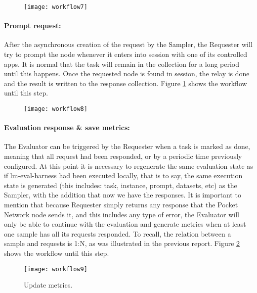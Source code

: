 \begin{figure}[H]
    \centering
    \texttt{[image: workflow7]}
    \caption{}
    \label{secb:fig:wf7}
\end{figure}


\paragraph{Prompt request:}
After the asynchronous creation of the request by the Sampler, the Requester will try to prompt the node whenever it enters into session with one of its controlled apps. It is normal that the task will remain in the collection for a long period until this happens. Once the requested node is found in session, the relay is done and the result is written to the response collection.
Figure \ref{secb:fig:wf7} shows the workflow until this step.

\begin{figure}[H]
    \centering
    \texttt{[image: workflow8]}
    \caption{}
    \label{secb:fig:wf8}
\end{figure}

\paragraph{Evaluation response \& save metrics:}
The Evaluator can be triggered by the Requester when a task is marked as done, meaning that all request had been responded, or by a periodic time previously configured. 
At this point it is necessary to regenerate the same evaluation state as if lm-eval-harness had been executed locally, that is to say, the same execution state is generated (this includes: task, instance, prompt, datasets, etc) as the Sampler, with the addition that now we have the responses. 
It is important to mention that because Requester simply returns any response that the Pocket Network node sends it, and this includes any type of error, the Evaluator will only be able to continue with the evaluation and generate metrics when at least one sample has all its requests responded. 
To recall, the relation between a sample and requests is 1:N, as was illustrated in the previous report. 
Figure \ref{secb:fig:wf8} shows the workflow until this step.



\begin{figure}[htb!]
    \centering
    \texttt{[image: workflow9]}
    \caption{Update metrics.}
    \label{secb:fig:wf9}
\end{figure}

